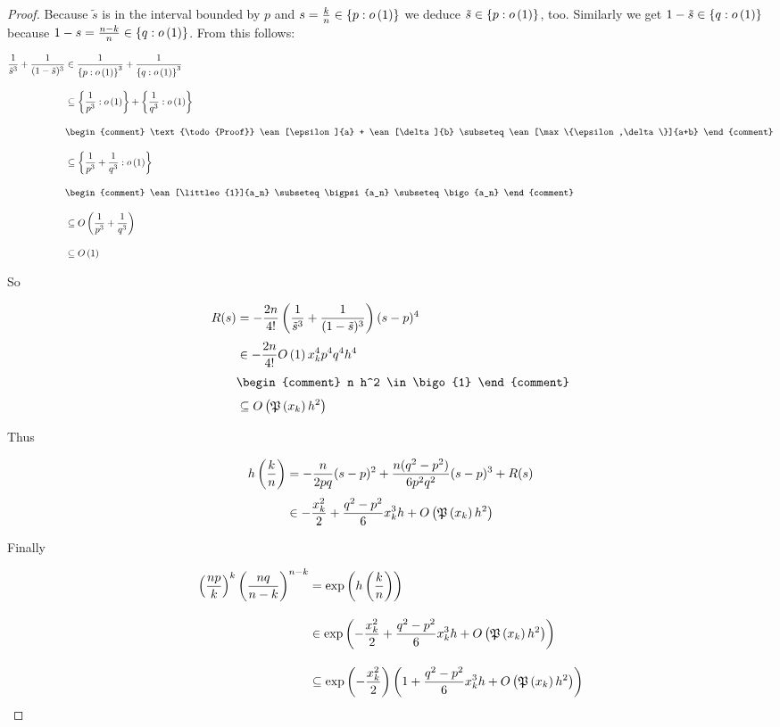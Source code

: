 \begin{proof}

  Because $\tilde s$ is in the interval bounded by $p$ and $s=\frac kn \in \ean[\littleo{1}]{p}$ we deduce $\tilde s \in \ean[\littleo{1}]{p}$, too. Similarly we get $1-\tilde s\in\ean[\littleo{1}]{q}$ because $1-s = \frac{n-k}{n} \in \ean[\littleo{1}]{q}$. From this follows:

  \begin{align}
    \frac 1{\tilde s^3} + \frac 1{(1-\tilde s)^3} & \in \frac 1{\ean[\littleo{1}]{p}^3} + \frac 1{\ean[\littleo{1}]{q}^3} \bnl
    & \subseteq \ean[\littleo{1}]{\frac 1{p^3}} + \ean[\littleo{1}]{\frac 1{q^3}} \bnl
    &
    \begin{comment}
      \text{\todo{Proof}} \ean[\epsilon]{a} + \ean[\delta]{b} \subseteq \ean[\max\{\epsilon,\delta\}]{a+b}
    \end{comment} \bnl
    & \subseteq \ean[\littleo{1}]{\frac 1{p^3} + \frac 1{q^3}} \bnl
    &
    \begin{comment}
      \ean[\littleo{1}]{a_n} \subseteq \bigpsi{a_n} \subseteq \bigo{a_n}
    \end{comment} \bnl
    & \subseteq \bigo{\frac 1{p^3} + \frac 1{q^3}} \bnl
    & \subseteq \bigo{1}
  \end{align}

  \noindent So

  \begin{align}
    R(s) & = -\frac{2n}{4!} \left(\frac 1{\tilde s^3} + \frac 1{(1-\tilde s)^3}\right) (s-p)^4 \nl
    & \in -\frac{2n}{4!} \bigo{1} \x^4 p^4 q^4 h^4 \nl
    &
    \begin{comment}
      n h^2 \in \bigo{1}
    \end{comment} \nl
    & \subseteq \bigo{\pol{\x} h^2}
  \end{align}

  \noindent Thus

  \begin{align}
    \h{\frac kn} &=-\frac{n}{2pq} (s-p)^2 + \frac{n(q^2-p^2)}{6p^2q^2} (s-p)^3 + R(s) \nl
    & \in -\frac{\x^2}{2} + \frac{q^2-p^2}{6} \x^3 h + \bigo{\pol{\x} h^2}
  \end{align}

  \noindent Finally

  \begin{align}
    \left(\frac{np}{k}\right)^k \left(\frac{nq}{n-k}\right)^{n-k} & = \fexp{\h{\frac kn}} \bnl
    & \in \fexp{-\frac{\x^2}{2} + \frac{q^2-p^2}{6} \x^3 h + \bigo{\pol{\x} h^2}} \bnl
    & \subseteq \fexp{-\frac{\x^2}{2}} \left( 1 + \frac{q^2-p^2}6 \x^3 h + \bigo{\pol{\x} h^2} \right)
  \end{align}


\end{proof}
